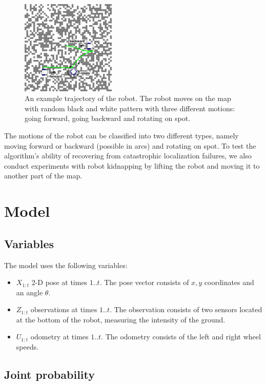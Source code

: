 \documentclass[letterpaper, 10pt, conference]{ieeeconf}
\begin{document}
\begin{figure}
\begin{center}
\includegraphics[width=0.4\textwidth]{dataset}
\caption{An example trajectory of the robot. The robot moves on the map with random black and white pattern with three different motions: going forward, going backward and rotating on spot.}
\label{fig:dataset}
\end{center}
\end{figure}

The motions of the robot can be classified into two different types, namely moving forward or backward (possible in arcs) and rotating on spot.
To test the algorithm's ability of recovering from catastrophic localization failures, we also conduct experiments with robot kidnapping by lifting the robot and moving it to another part of the map.

\section{Model}

\subsection{Variables}

The model uses the following variables:
\begin{itemize}
\item $X_{1:t}$ 2-D pose at times $1..t$.
The pose vector consists of $x,y$ coordinates and an angle $\theta$.
\item $Z_{1:t}$ observations at times $1..t$.
The observation consists of two sensors located at the bottom of the robot, measuring the intensity of the ground.
\item $U_{1:t}$ odometry at times $1..t$.
The odometry consists of the left and right wheel speeds.
\end{itemize}

\subsection{Joint probability}
\end{document}
